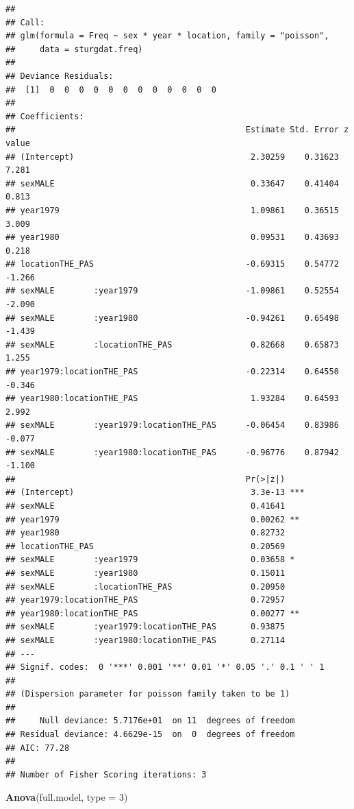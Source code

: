 \documentclass[
  12pt,
]{book}
\newenvironment{Shaded}{\begin{snugshade}}{\end{snugshade}}
\newcommand{\DataTypeTok}[1]{\textcolor[rgb]{0.13,0.29,0.53}{#1}}
\newcommand{\DecValTok}[1]{\textcolor[rgb]{0.00,0.00,0.81}{#1}}
\newcommand{\KeywordTok}[1]{\textcolor[rgb]{0.13,0.29,0.53}{\textbf{#1}}}
\newcommand{\NormalTok}[1]{#1}
\begin{document}
\begin{verbatim}
## 
## Call:
## glm(formula = Freq ~ sex * year * location, family = "poisson", 
##     data = sturgdat.freq)
## 
## Deviance Residuals: 
##  [1]  0  0  0  0  0  0  0  0  0  0  0  0
## 
## Coefficients:
##                                               Estimate Std. Error z value
## (Intercept)                                    2.30259    0.31623   7.281
## sexMALE                                        0.33647    0.41404   0.813
## year1979                                       1.09861    0.36515   3.009
## year1980                                       0.09531    0.43693   0.218
## locationTHE_PAS                               -0.69315    0.54772  -1.266
## sexMALE        :year1979                      -1.09861    0.52554  -2.090
## sexMALE        :year1980                      -0.94261    0.65498  -1.439
## sexMALE        :locationTHE_PAS                0.82668    0.65873   1.255
## year1979:locationTHE_PAS                      -0.22314    0.64550  -0.346
## year1980:locationTHE_PAS                       1.93284    0.64593   2.992
## sexMALE        :year1979:locationTHE_PAS      -0.06454    0.83986  -0.077
## sexMALE        :year1980:locationTHE_PAS      -0.96776    0.87942  -1.100
##                                               Pr(>|z|)    
## (Intercept)                                    3.3e-13 ***
## sexMALE                                        0.41641    
## year1979                                       0.00262 ** 
## year1980                                       0.82732    
## locationTHE_PAS                                0.20569    
## sexMALE        :year1979                       0.03658 *  
## sexMALE        :year1980                       0.15011    
## sexMALE        :locationTHE_PAS                0.20950    
## year1979:locationTHE_PAS                       0.72957    
## year1980:locationTHE_PAS                       0.00277 ** 
## sexMALE        :year1979:locationTHE_PAS       0.93875    
## sexMALE        :year1980:locationTHE_PAS       0.27114    
## ---
## Signif. codes:  0 '***' 0.001 '**' 0.01 '*' 0.05 '.' 0.1 ' ' 1
## 
## (Dispersion parameter for poisson family taken to be 1)
## 
##     Null deviance: 5.7176e+01  on 11  degrees of freedom
## Residual deviance: 4.6629e-15  on  0  degrees of freedom
## AIC: 77.28
## 
## Number of Fisher Scoring iterations: 3
\end{verbatim}

\begin{Shaded}
\begin{Highlighting}[]
\KeywordTok{Anova}\NormalTok{(full.model, }\DataTypeTok{type =} \DecValTok{3}\NormalTok{)}
\end{Highlighting}
\end{Shaded}
\end{document}
